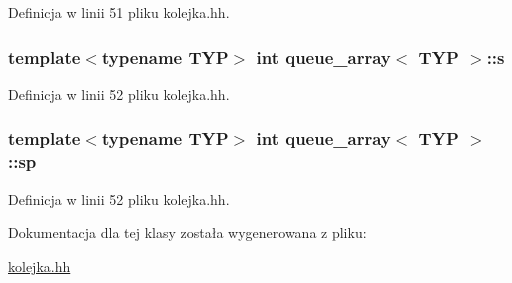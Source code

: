 Definicja w linii 51 pliku kolejka.\-hh.

\hypertarget{classqueue__array_a87d275726c2f69acb8ea9f0b3ab899f6}{
\subsubsection[{s}]{\setlength{\rightskip}{0pt plus 5cm}template$<$typename T\-Y\-P$>$ int {\bf queue\-\_\-array}$<$ T\-Y\-P $>$\-::s\hspace{0.3cm}{\ttfamily [private]}}}\label{classqueue__array_a87d275726c2f69acb8ea9f0b3ab899f6}


Definicja w linii 52 pliku kolejka.\-hh.

\hypertarget{classqueue__array_a94cdc73c1df75d4fe0c75a852528cde9}{
\subsubsection[{sp}]{\setlength{\rightskip}{0pt plus 5cm}template$<$typename T\-Y\-P$>$ int {\bf queue\-\_\-array}$<$ T\-Y\-P $>$\-::sp\hspace{0.3cm}{\ttfamily [private]}}}\label{classqueue__array_a94cdc73c1df75d4fe0c75a852528cde9}


Definicja w linii 52 pliku kolejka.\-hh.



Dokumentacja dla tej klasy została wygenerowana z pliku\-:\begin{DoxyCompactItemize}
\item 
\hyperlink{kolejka_8hh}{kolejka.\-hh}\end{DoxyCompactItemize}
